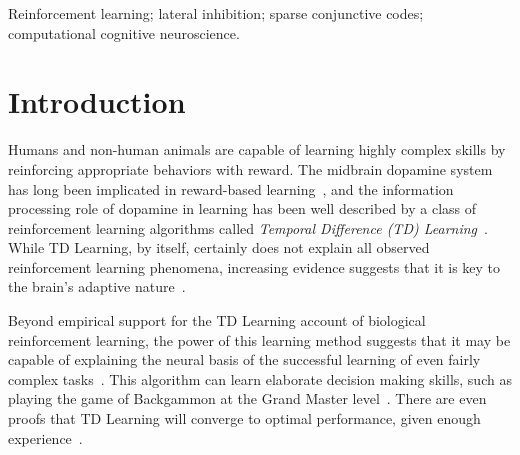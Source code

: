 \documentclass[preprint,12pt,authoryear]{elsarticle}
\begin{document}
\begin{frontmatter}
\begin{keyword}


Reinforcement learning; lateral inhibition; sparse conjunctive codes;
computational cognitive neuroscience.

\end{keyword}

\end{frontmatter}



\section{Introduction}
\label{sec:introduction}

Humans and non-human animals are capable of learning highly complex
skills by reinforcing appropriate behaviors with reward. The midbrain
dopamine system has long been implicated in reward-based
learning~\citep{SchultzW:1993:Dopamine}, and the information processing
role of dopamine in learning has been well described by a class of
reinforcement learning algorithms called \emph{Temporal Difference
(TD) 
Learning}~\citep{MontaguePR:1996:Dopamine,SchultzW:1997:Science}. While 
TD Learning, by itself, certainly does not explain all observed
reinforcement learning phenomena, increasing evidence suggests
that it is key to the brain's adaptive
nature~\citep{DayanP:2008:Ugly}.

Beyond empirical support for the TD Learning account of biological
reinforcement learning, the power of this learning method suggests
that it may be capable of explaining the neural basis of the
successful learning of even fairly complex
tasks~\citep{SuttonRS:1998:Book}. This algorithm can learn
elaborate decision making skills, such as playing the game of
Backgammon at the Grand Master
level~\citep{TesauroG:1995:TDGammon}. There are even proofs that TD
Learning will converge to optimal performance, given enough
experience~\citep{DayanP:1992:Proof}.
\end{document}
